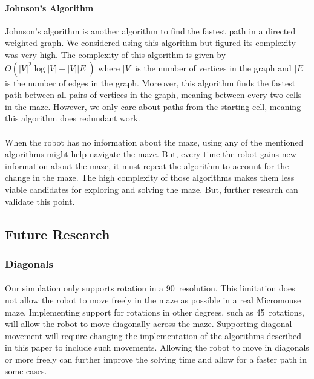 \documentclass[12pt]{article}
\begin{document}
\paragraph{Johnson's Algorithm}
Johnson's algorithm is another algorithm to find the fastest path in a directed weighted \gls{graph}.
We considered using this algorithm but figured its complexity was very high.
The complexity of this algorithm is given by $O(|V|^2\log |V| + |V||E|)$ where $|V|$ is the number of vertices in the \gls{graph} and $|E|$ is the number of edges in the \gls{graph}.
Moreover, this algorithm finds the fastest path between all pairs of vertices in the \gls{graph}, meaning between every two \gls{cell}s in the \gls{maze}.
However, we only care about paths from the starting \gls{cell}, meaning this algorithm does redundant work.

\paragraph{}
When the robot has no information about the \gls{maze}, using any of the mentioned algorithms might help navigate the \gls{maze}.
But, every time the robot gains new information about the \gls{maze}, it must repeat the algorithm to account for the change in the \gls{maze}.
The high complexity of those algorithms makes them less viable candidates for exploring and solving the \gls{maze}.
But, further research can validate this point.

\subsection{Future Research}
\subsubsection{Diagonals}
\paragraph{}
Our simulation only supports rotation in a 90\textdegree\ resolution.
This limitation does not allow the robot to move freely in the \gls{maze} as possible in a real \gls{Micromouse} \gls{maze}.
Implementing support for rotations in other degrees, such as 45\textdegree\ rotations, will allow the robot to move diagonally across the \gls{maze}.
Supporting diagonal movement will require changing the implementation of the algorithms described in this paper to include such movements.
Allowing the robot to move in diagonals or more freely can further improve the solving time and allow for a faster path in some cases.
\end{document}
